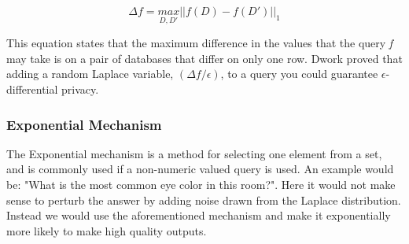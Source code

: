 $$\Delta \mathit{f}=\underset{D,D'}{max}||\mathit{f(D)}-\mathit{f(D')}||_{1}$$

This equation states that the maximum difference in the values that the query \textit{f} may take is on a pair of databases that differ on only one row. Dwork proved that adding a random Laplace variable, $(\Delta f/\epsilon)$, to a query you could guarantee $\epsilon$-differential privacy\cite{dwork2013algorithmic}. 

\subsubsection{Exponential Mechanism}
The Exponential mechanism is a method for selecting one element from a set, and is commonly used if a non-numeric valued query is used. An example would be: "What is the most common eye color in this room?". Here it would not make sense to perturb the answer by adding noise drawn from the Laplace distribution. Instead we would use the aforementioned mechanism and make it exponentially more likely to make high quality outputs.  
\cleardoublepage
